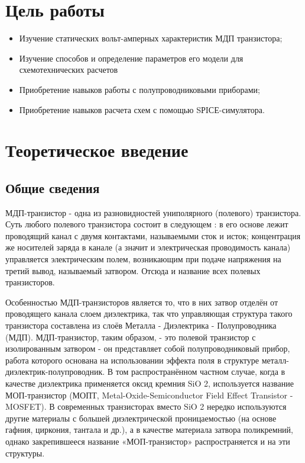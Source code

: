 \documentclass[a4paper,14pt]{article}
\begin{document}

\tableofcontents
\pagebreak
\section{Цель работы}

\begin{itemize}
	\item Изучение статических вольт-амперных характеристик МДП транзистора;
	\item Изучение способов и определение параметров его модели для схемотехнических расчетов
	\item Приобретение навыков работы с полупроводниковыми приборами;
	\item Приобретение навыков расчета схем с помощью SРIСЕ-симулятора.
\end{itemize}

\section{Теоретическое введение}

\subsection{Общие сведения}

МДП-транзистор - одна из разновидностей униполярного (полевого)
транзистора. Суть любого полевого транзистора состоит в следующем : в его
основе лежит проводящий канал с двумя контактами, называемыми сток
и исток; концентрация же носителей заряда в канале (а значит и электрическая
проводимость канала) управляется электрическим полем, возникающим
при подаче напряжения на третий вывод, называемый затвором. Отсюда
и название всех полевых транзисторов.

Особенностью МДП-транзисторов является то, что в них затвор отделён
от проводящего канала слоем диэлектрика, так что управляющая структура
такого транзистора составлена из слоёв Металла - Диэлектрика - Полупроводника
(МДП). МДП-транзистор, таким образом, - это полевой транзистор
с изолированным затвором - он представляет собой полупроводниковый
прибор, работа которого основана на использовании эффекта поля в структуре
металл-диэлектрик-полупроводник. В том распространённом частном
случае, когда в качестве диэлектрика применяется оксид кремния SiO 2, используется
название МОП-транзистор (МОПТ, Metal-Oxide-Semiconductor 
Field Effect Transistor - MOSFET). В современных транзисторах вместо SiO 2
нередко используются другие материалы с большей диэлектрической проницаемостью
(на основе гафния, циркония, тантала и др.), а в качестве материала
затвора поликремний, однако закрепившееся название «МОП-транзистор»
распространяется и на эти структуры.
\end{document}
